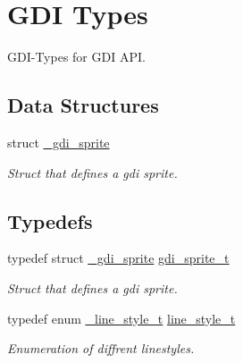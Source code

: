 \hypertarget{group__hgdi__types}{
\section{GDI Types}
\label{group__hgdi__types}
}
GDI-Types for GDI API.  


\subsection*{Data Structures}
\begin{CompactItemize}
\item 
struct \hyperlink{struct__gdi__sprite}{\_\-gdi\_\-sprite}
\begin{CompactList}\small\item\em Struct that defines a gdi sprite. \item\end{CompactList}\end{CompactItemize}
\subsection*{Typedefs}
\begin{CompactItemize}
\item 
\hypertarget{group__hgdi__types_g0299a1999e1fbcc93dc5a54dc22b70b5}{
typedef struct \hyperlink{struct__gdi__sprite}{\_\-gdi\_\-sprite} \hyperlink{group__hgdi__types_g0299a1999e1fbcc93dc5a54dc22b70b5}{gdi\_\-sprite\_\-t}}
\label{group__hgdi__types_g0299a1999e1fbcc93dc5a54dc22b70b5}

\begin{CompactList}\small\item\em Struct that defines a gdi sprite. \item\end{CompactList}\item 
\hypertarget{group__hgdi__types_gdfccdb9380d340f00e646a1fd04b79d9}{
typedef enum \hyperlink{group__hgdi__types_g8f4f6dec94a8b54dc690018424721e38}{\_\-line\_\-style\_\-t} \hyperlink{group__hgdi__types_gdfccdb9380d340f00e646a1fd04b79d9}{line\_\-style\_\-t}}
\label{group__hgdi__types_gdfccdb9380d340f00e646a1fd04b79d9}

\begin{CompactList}\small\item\em Enumeration of diffrent linestyles. \item\end{CompactList}\end{CompactItemize}
